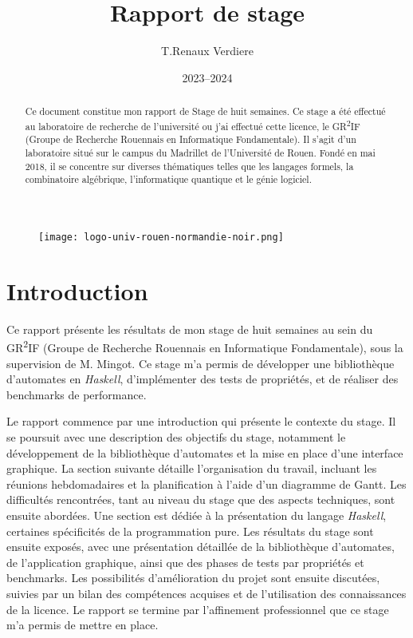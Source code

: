 \documentclass[12pt]{article}
\title{Rapport de stage}
\author{T.Renaux Verdiere}
\date{2023--2024}
\begin{document}
\begin{figure}
    \texttt{[image: logo-univ-rouen-normandie-noir.png]}
\end{figure}

\maketitle

\begin{abstract}
    Ce document constitue mon rapport de Stage de huit semaines. Ce stage a été
    effectué au laboratoire de recherche de l'université ou j'ai effectué cette  
    licence, le GR\textsuperscript{2}IF (Groupe de Recherche Rouennais en 
    Informatique Fondamentale). Il s'agit d'un laboratoire situé sur le campus 
    du Madrillet de l’Université de Rouen. Fondé en mai 2018, il se concentre 
    sur diverses thématiques telles que les langages formels, la combinatoire 
    algébrique, l’informatique quantique et le génie logiciel.
\end{abstract}

\newpage   

\tableofcontents

\newpage

\section{Introduction}

Ce rapport présente les résultats de mon stage de huit semaines au sein du 
GR\textsuperscript{2}IF (Groupe de Recherche Rouennais en Informatique 
Fondamentale), sous la supervision de M. Mingot. Ce stage m'a permis de 
développer une bibliothèque d’automates en \textit{Haskell}, d’implémenter des 
tests de propriétés, et de réaliser des benchmarks de performance.

Le rapport commence par une introduction qui présente le contexte du stage. Il 
se poursuit avec une description des objectifs du stage, notamment le 
développement de la bibliothèque d’automates et la mise en place d’une interface 
graphique. La section suivante détaille l’organisation du travail, incluant les 
réunions hebdomadaires et la planification à l’aide d’un diagramme de Gantt. Les 
difficultés rencontrées, tant au niveau du stage que des aspects techniques, 
sont ensuite abordées. Une section est dédiée à la présentation du langage 
\textit{Haskell}, certaines spécificités de la programmation pure. Les résultats
du stage sont ensuite exposés, avec une présentation détaillée de la 
bibliothèque d’automates, de l’application graphique, ainsi que des phases de 
tests par propriétés et benchmarks. Les possibilités d’amélioration du projet 
sont ensuite discutées, suivies par un bilan des compétences acquises et de 
l’utilisation des connaissances de la licence. Le rapport se termine par 
l'affinement professionnel que ce stage m'a permis de mettre en place.









\newpage

\printbibliography
\end{document}
